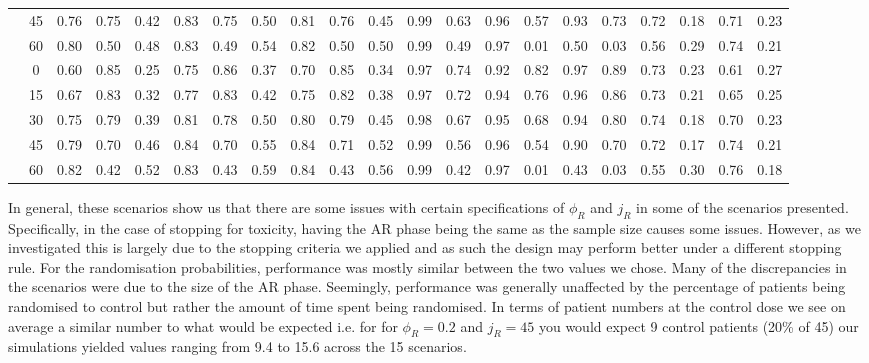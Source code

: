 \begin{table}[h!]
{\begin{tabular}[t]{ccccccccccccccccccccc}
			\hspace{1em} & 45 & 0.76 & 0.75 & 0.42 & 0.83 & 0.75 & 0.50 & 0.81 & 0.76 & 0.45 & 0.99 & 0.63 & 0.96 & 0.57 & 0.93 & 0.73 & 0.72 & 0.18 & 0.71 & 0.23\\
			
			\hspace{1em}\multirow{-5}{*}{\centering\arraybackslash 0.20} & 60 & 0.80 & 0.50 & 0.48 & 0.83 & 0.49 & 0.54 & 0.82 & 0.50 & 0.50 & 0.99 & 0.49 & 0.97 & 0.01 & 0.50 & 0.03 & 0.56 & 0.29 & 0.74 & 0.21\\
			\cmidrule{1-21}
			& 0 & 0.60 & 0.85 & 0.25 & 0.75 & 0.86 & 0.37 & 0.70 & 0.85 & 0.34 & 0.97 & 0.74 & 0.92 & 0.82 & 0.97 & 0.89 & 0.73 & 0.23 & 0.61 & 0.27\\
			
			\hspace{1em} & 15 & 0.67 & 0.83 & 0.32 & 0.77 & 0.83 & 0.42 & 0.75 & 0.82 & 0.38 & 0.97 & 0.72 & 0.94 & 0.76 & 0.96 & 0.86 & 0.73 & 0.21 & 0.65 & 0.25\\
			
			\hspace{1em} & 30 & 0.75 & 0.79 & 0.39 & 0.81 & 0.78 & 0.50 & 0.80 & 0.79 & 0.45 & 0.98 & 0.67 & 0.95 & 0.68 & 0.94 & 0.80 & 0.74 & 0.18 & 0.70 & 0.23\\
			
			\hspace{1em} & 45 & 0.79 & 0.70 & 0.46 & 0.84 & 0.70 & 0.55 & 0.84 & 0.71 & 0.52 & 0.99 & 0.56 & 0.96 & 0.54 & 0.90 & 0.70 & 0.72 & 0.17 & 0.74 & 0.21\\
			
			\hspace{1em}\multirow{-5}{*}{\centering\arraybackslash 0.33} & 60 & 0.82 & 0.42 & 0.52 & 0.83 & 0.43 & 0.59 & 0.84 & 0.43 & 0.56 & 0.99 & 0.42 & 0.97 & 0.01 & 0.43 & 0.03 & 0.55 & 0.30 & 0.76 & 0.18\\
			\bottomrule
	\end{tabular}}
\end{table}

In general, these scenarios show us that there are some issues with certain specifications of $\phi_R$ and $j_R$ in some of the scenarios presented. Specifically, in the case of stopping for toxicity, having the AR phase being the same as the sample size causes some issues. However, as we investigated this is largely due to the stopping criteria we applied and as such the design may perform better under a different stopping rule. For the randomisation probabilities, performance was mostly similar between the two values we chose. Many of the discrepancies in the scenarios were due to the size of the AR phase. Seemingly, performance was generally unaffected by the percentage of patients being randomised to control but rather the amount of time spent being randomised. In terms of patient numbers at the control dose we see on average a similar number to what would be expected i.e. for  for $\phi_R = 0.2$ and  $j_R = 45$ you would expect 9 control patients (20\% of 45) our simulations yielded values ranging from 9.4 to 15.6 across the 15 scenarios. 

